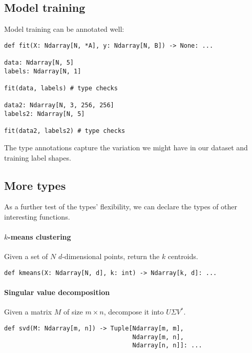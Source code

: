 \documentclass[12pt]{report}
\begin{document}
\subsection{Model training}
Model training can be annotated well:
\begin{singlespace*}
    \begin{verbatim}
def fit(X: Ndarray[N, *A], y: Ndarray[N, B]) -> None: ...

data: Ndarray[N, 5]
labels: Ndarray[N, 1]

fit(data, labels) # type checks

data2: Ndarray[N, 3, 256, 256]
labels2: Ndarray[N, 5]

fit(data2, labels2) # type checks\end{verbatim}
\end{singlespace*}
The type annotations capture the variation we might have in our dataset and training label shapes.

\subsection{More types}

As a further test of the types' flexibility, we can declare the types of other interesting functions.

\paragraph{$k$-means clustering}
Given a set of $N$ $d$-dimensional points, return the $k$ centroids.

\begin{singlespace*}
    \begin{verbatim}
def kmeans(X: Ndarray[N, d], k: int) -> Ndarray[k, d]: ... \end{verbatim}
\end{singlespace*}

\paragraph{Singular value decomposition}
Given a matrix $M$ of size $m \times n$, decompose it into $U\Sigma V^*$.
\begin{singlespace*}
    \begin{verbatim}
def svd(M: Ndarray[m, n]) -> Tuple[Ndarray[m, m],
                                   Ndarray[m, n],
                                   Ndarray[n, n]]: ...\end{verbatim}
\end{singlespace*}
\end{document}
